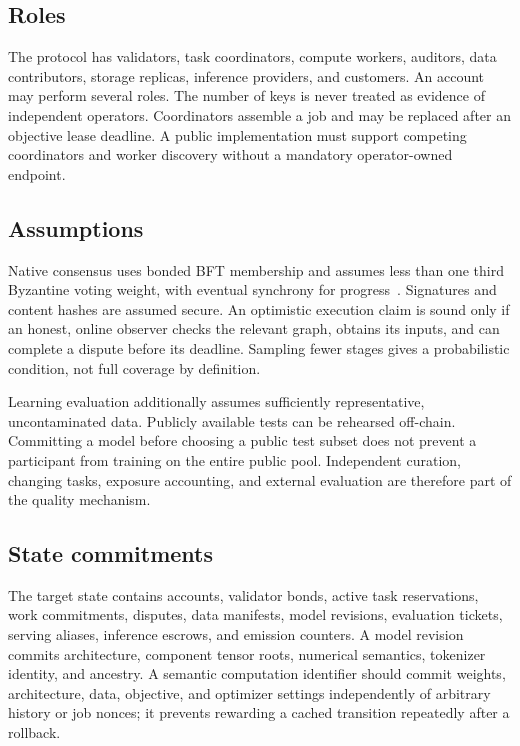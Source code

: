 \documentclass[11pt]{article}
\begin{document}
\subsection{Roles}
The protocol has validators, task coordinators, compute workers, auditors, data contributors, storage replicas, inference providers, and customers. An account may perform several roles. The number of keys is never treated as evidence of independent operators. Coordinators assemble a job and may be replaced after an objective lease deadline. A public implementation must support competing coordinators and worker discovery without a mandatory operator-owned endpoint.

\subsection{Assumptions}
Native consensus uses bonded BFT membership and assumes less than one third Byzantine voting weight, with eventual synchrony for progress~\cite{tendermint}. Signatures and content hashes are assumed secure. An optimistic execution claim is sound only if an honest, online observer checks the relevant graph, obtains its inputs, and can complete a dispute before its deadline. Sampling fewer stages gives a probabilistic condition, not full coverage by definition.

Learning evaluation additionally assumes sufficiently representative, uncontaminated data. Publicly available tests can be rehearsed off-chain. Committing a model before choosing a public test subset does not prevent a participant from training on the entire public pool. Independent curation, changing tasks, exposure accounting, and external evaluation are therefore part of the quality mechanism.

\subsection{State commitments}
The target state contains accounts, validator bonds, active task reservations, work commitments, disputes, data manifests, model revisions, evaluation tickets, serving aliases, inference escrows, and emission counters. A model revision commits architecture, component tensor roots, numerical semantics, tokenizer identity, and ancestry. A semantic computation identifier should commit weights, architecture, data, objective, and optimizer settings independently of arbitrary history or job nonces; it prevents rewarding a cached transition repeatedly after a rollback.
\end{document}
